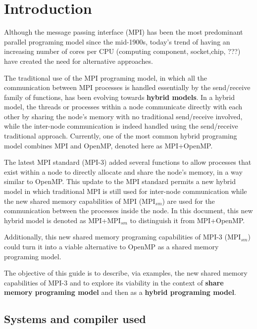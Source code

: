 \section{Introduction}
Although the message passing interface (MPI) has been the most predominant parallel programing model since the mid-1900s, today's trend of having an increasing number of cores per CPU (computing component, socket,chip, ???) have created the need for alternative approaches.

\medskip

The traditional use of the MPI programing model, in which all the communication between MPI processes is handled essentially by the send/receive family of functions, has been evolving towards \textbf{hybrid models}. In a hybrid model, the threads or processes within a node communicate directly with each other by sharing the node's memory with no traditional send/receive involved, while the inter-node communication is indeed handled using the send/receive traditional approach. Currently, one of the most common hybrid programing model combines MPI and OpenMP, denoted here as MPI+OpenMP.

\medskip

The latest MPI standard (MPI-3) added several functions to allow processes that exist within a node to directly allocate and share the node's memory, in a way similar to OpenMP. This update to the MPI standard permits a new hybrid model in which traditional MPI is still used for inter-node communication while the new shared memory capabilities of MPI (MPI$_{sm}$) are used for the communication between the processes inside the node. In this document, this new hybrid model is denoted as MPI+MPI$_{sm}$ to distinguish it from MPI+OpenMP.

\medskip


Additionally, this new shared memory programing capabilities of MPI-3 (MPI$_{sm}$) could turn it into a viable alternative to OpenMP as a shared memory programing model.
 
\medskip


The objective of this guide is to describe, via examples, the new shared memory capabilities of MPI-3 and to explore its viability in the context of \textbf{share memory programing model} and then as a \textbf{hybrid programing model}.


\subsection*{Systems and compiler used}

